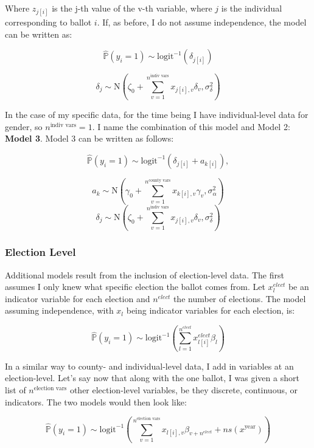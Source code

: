 \documentclass[12pt,twoside]{reedthesis}
\begin{document}
  Where \(z_{j[i]}\) is the j-th value of the v-th variable, where \(j\)
  is the individual corresponding to ballot \(i\). If, as before, I do not
  assume independence, the model can be written as:
  
  \[\hat{\mathbb{P}}(y_i = 1) \sim \text{logit}^{-1}(\delta_{j[i]})\]
  
  \[\delta_{j} \sim \text{N}(\zeta_0 + \sum_{v=1}^{n^{\text{indiv vars}}}x_{j[i], v}\delta_{v}, \sigma_{\delta}^2)\]
  
  In the case of my specific data, for the time being I have
  individual-level data for gender, so \(n^{\text{indiv vars}} = 1\). I
  name the combination of this model and Model 2: \textbf{Model 3}. Model
  3 can be written as follows:
  
  \begin{equation} \tag{Model 3}
  \hat{\mathbb{P}}(y_i = 1) \sim \text{logit}^{-1}(\delta_{j[i]} + a_{k[i]}), 
  \end{equation}
  
  \[a_{k} \sim \text{N}(\gamma_0 + \sum_{v=1}^{n^{\text{county vars}}}x_{k[i], v}\gamma_{v}, \sigma_{\alpha}^2)\]
  \[\delta_{j} \sim \text{N}(\zeta_0 + \sum_{v=1}^{n^{\text{indiv vars}}}x_{j[i], v}\delta_{v}, \sigma_{\delta}^2)\]
  
  \subsubsection{Election Level}\label{election-level}
  
  Additional models result from the inclusion of election-level data. The
  first assumes I only knew what specific election the ballot comes from.
  Let \(x_{l}^{elect}\) be an indicator variable for each election and
  \(n^{elect}\) the number of elections. The model assuming independence,
  with \(x_{l}\) being indicator variables for each election, is:
  
  \[\hat{\mathbb{P}}(y_i = 1) \sim \text{logit}^{-1}(\sum_{l = 1}^{n^{elect}}x_{l[i]}^{elect}\beta_{l})\]
  
  In a similar way to county- and individual-level data, I add in
  variables at an election-level. Let's say now that along with the one
  ballot, I was given a short list of \(n^{\text{election vars}}\) other
  election-level variables, be they discrete, continuous, or indicators.
  The two models would then look like:
  
  \begin{equation} \tag{Model 4}
  \hat{\mathbb{P}}(y_i = 1) \sim \text{logit}^{-1}(\sum_{v=1}^{n^{\text{election vars}}}x_{l[i], v}\beta_{v+n^{elect}} + ns(x^{\text{year}}))
  \end{equation}
  
\end{document}
